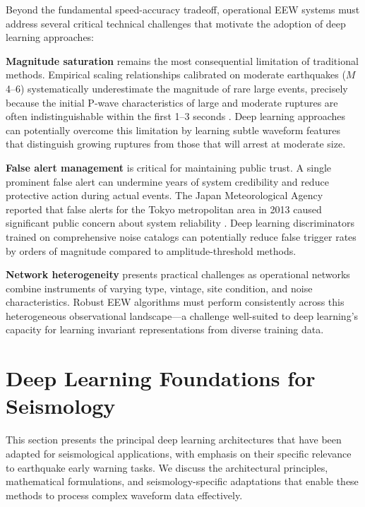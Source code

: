 \documentclass[review,authoryear]{elsarticle}
\begin{document}
Beyond the fundamental speed-accuracy tradeoff, operational EEW systems must address several critical technical challenges that motivate the adoption of deep learning approaches:

\textbf{Magnitude saturation} remains the most consequential limitation of traditional methods. Empirical scaling relationships calibrated on moderate earthquakes ($M$ 4--6) systematically underestimate the magnitude of rare large events, precisely because the initial P-wave characteristics of large and moderate ruptures are often indistinguishable within the first 1--3 seconds \citep{kuyuk2013global}. Deep learning approaches can potentially overcome this limitation by learning subtle waveform features that distinguish growing ruptures from those that will arrest at moderate size.

\textbf{False alert management} is critical for maintaining public trust. A single prominent false alert can undermine years of system credibility and reduce protective action during actual events. The Japan Meteorological Agency reported that false alerts for the Tokyo metropolitan area in 2013 caused significant public concern about system reliability \citep{hoshiba2011earthquake}. Deep learning discriminators trained on comprehensive noise catalogs can potentially reduce false trigger rates by orders of magnitude compared to amplitude-threshold methods.

\textbf{Network heterogeneity} presents practical challenges as operational networks combine instruments of varying type, vintage, site condition, and noise characteristics. Robust EEW algorithms must perform consistently across this heterogeneous observational landscape---a challenge well-suited to deep learning's capacity for learning invariant representations from diverse training data.


\section{Deep Learning Foundations for Seismology}
\label{sec:dl_foundations}

This section presents the principal deep learning architectures that have been adapted for seismological applications, with emphasis on their specific relevance to earthquake early warning tasks. We discuss the architectural principles, mathematical formulations, and seismology-specific adaptations that enable these methods to process complex waveform data effectively.
\end{document}
